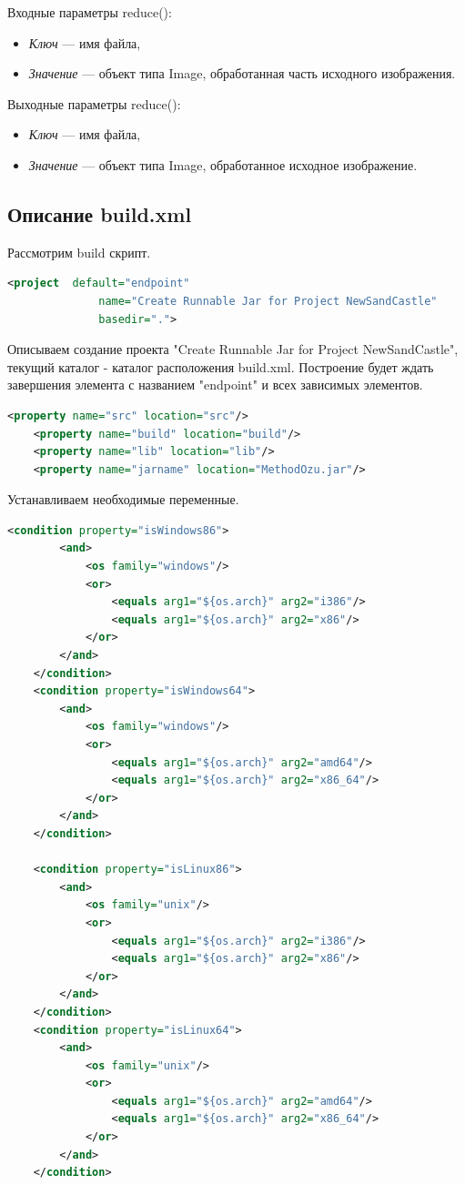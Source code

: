 \documentclass[12pt,a4paper]{extarticle} %
\begin{document}
    \noindent Входные параметры reduce():
    \begin{itemize}
        \item[] \textit{Ключ} --- имя файла,
        \item[] \textit{Значение} --- объект типа Image, обработанная часть исходного изображения.
    \end{itemize}

    \noindent Выходные параметры reduce():
    \begin{itemize}
        \item[] \textit{Ключ} --- имя файла,
        \item[] \textit{Значение} --- объект типа Image, обработанное исходное изображение.
    \end{itemize}

    

\subsection{Описание build.xml}
    Рассмотрим build скрипт.

\begin{lstlisting}[language=xml]
    <project  default="endpoint" 
              name="Create Runnable Jar for Project NewSandCastle" 
              basedir=".">
\end{lstlisting}
    
    Описываем создание проекта "Create Runnable Jar for Project NewSandCastle", текущий каталог - каталог расположения build.xml. Построение будет ждать завершения элемента с названием "endpoint" и всех зависимых элементов.
\begin{lstlisting}[language=xml]
    <property name="src" location="src"/>
    <property name="build" location="build"/>
    <property name="lib" location="lib"/>    
    <property name="jarname" location="MethodOzu.jar"/>
\end{lstlisting}

    Устанавливаем необходимые переменные.
\begin{lstlisting}[language=xml]
    <condition property="isWindows86">
        <and>
            <os family="windows"/>
            <or>
                <equals arg1="${os.arch}" arg2="i386"/>
                <equals arg1="${os.arch}" arg2="x86"/>
            </or>
        </and>
    </condition>
    <condition property="isWindows64">
        <and>
            <os family="windows"/>
            <or>
                <equals arg1="${os.arch}" arg2="amd64"/>
                <equals arg1="${os.arch}" arg2="x86_64"/>
            </or>
        </and>        
    </condition>

    <condition property="isLinux86">
        <and>        
            <os family="unix"/>
            <or>
                <equals arg1="${os.arch}" arg2="i386"/>
                <equals arg1="${os.arch}" arg2="x86"/>
            </or>
        </and>
    </condition>
    <condition property="isLinux64">
        <and>
            <os family="unix"/>
            <or>
                <equals arg1="${os.arch}" arg2="amd64"/>
                <equals arg1="${os.arch}" arg2="x86_64"/>
            </or>
        </and>        
    </condition>
\end{lstlisting}
\end{document}
